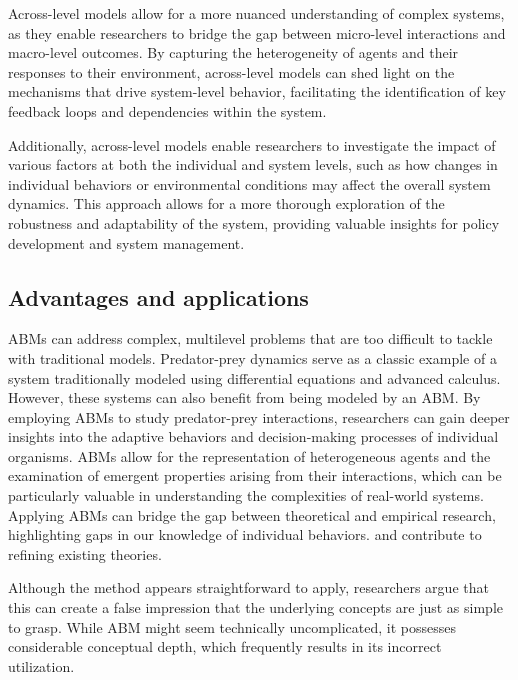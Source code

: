     Across-level models allow for a more nuanced understanding of complex systems, as they enable researchers to bridge the gap between micro-level interactions and macro-level outcomes. By capturing the heterogeneity of agents and their responses to their environment, across-level models can shed light on the mechanisms that drive system-level behavior, facilitating the identification of key feedback loops and dependencies within the system.

    Additionally, across-level models enable researchers to investigate the impact of various factors at both the individual and system levels, such as how changes in individual behaviors or environmental conditions may affect the overall system dynamics. This approach allows for a more thorough exploration of the robustness and adaptability of the system, providing valuable insights for policy development and system management.

\subsection{Advantages and applications}
    ABMs can address complex, multilevel problems that are too difficult to tackle with traditional models. Predator-prey dynamics serve as a classic example of a system traditionally modeled using differential equations and advanced calculus. However, these systems can also benefit from being modeled by an ABM\cite{railsback2020pred-prey}. By employing ABMs to study predator-prey interactions, researchers can gain deeper insights into the adaptive behaviors and decision-making processes of individual organisms. ABMs allow for the representation of heterogeneous agents and the examination of emergent properties arising from their interactions, which can be particularly valuable in understanding the complexities of real-world systems. Applying ABMs can bridge the gap between theoretical and empirical research, highlighting gaps in our knowledge of individual behaviors. and contribute to refining existing theories.

    Although the method appears straightforward to apply, researchers argue that this can create a false impression that the underlying concepts are just as simple to grasp. While ABM might seem technically uncomplicated, it possesses considerable conceptual depth, which frequently results in its incorrect utilization.